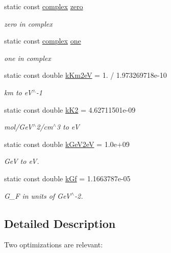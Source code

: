 \begin{DoxyCompactItemize}
\item 
static const \hyperlink{classOscProb_1_1PMNS__Base_ae86ec4718808ce9d02e5f5b4226714ab}{complex} \hyperlink{classOscProb_1_1PMNS__Base_a5c31ed4593cf95feb36fb80c1850d25e}{zero}
\begin{DoxyCompactList}\small\item\em zero in complex \end{DoxyCompactList}\item 
static const \hyperlink{classOscProb_1_1PMNS__Base_ae86ec4718808ce9d02e5f5b4226714ab}{complex} \hyperlink{classOscProb_1_1PMNS__Base_ab64aab27448a5aca27565c991a9d173e}{one}
\begin{DoxyCompactList}\small\item\em one in complex \end{DoxyCompactList}\item 
static const double \hyperlink{classOscProb_1_1PMNS__Base_a382ddd7b76ca89b43f22614a2ea7327b}{k\+Km2eV} = 1. / 1.\+973269718e-\/10
\begin{DoxyCompactList}\small\item\em km to e\+V$^\wedge$-\/1 \end{DoxyCompactList}\item 
static const double \hyperlink{classOscProb_1_1PMNS__Base_a326fc5016d7dd7ce05682c06cdcb6d94}{k\+K2} = 4.\+62711501e-\/09
\begin{DoxyCompactList}\small\item\em mol/\+Ge\+V$^\wedge$2/cm$^\wedge$3 to eV \end{DoxyCompactList}\item 
static const double \hyperlink{classOscProb_1_1PMNS__Base_ad36a0a6bf58d6ec093d3947784bd89e9}{k\+Ge\+V2eV} = 1.\+0e+09
\begin{DoxyCompactList}\small\item\em GeV to eV. \end{DoxyCompactList}\item 
static const double \hyperlink{classOscProb_1_1PMNS__Base_a7f26a3456128234b2ae6cc9141a6532f}{k\+Gf} = 1.\+1663787e-\/05
\begin{DoxyCompactList}\small\item\em G\+\_\+F in units of Ge\+V$^\wedge$-\/2. \end{DoxyCompactList}\end{DoxyCompactItemize}


\subsection{Detailed Description}
Two optimizations are relevant\+:~\newline

